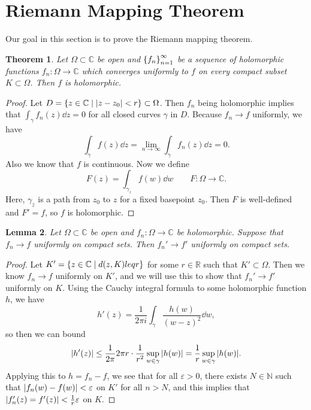 \documentclass[leqno, openany]{memoir}
\newtheorem{thm}{Theorem}[section]
\newtheorem{lem}[thm]{Lemma}
\theoremstyle{definition}
\theoremstyle{remark}
\theoremstyle{plain}
\theoremstyle{definition}
\theoremstyle{remark}
\newcommand{\R}{\mathbb{R}}
\newcommand{\C}{\mathbb{C}}
\newcommand{\N}{\mathbb{N}}
\newcommand{\ep}{\varepsilon}
\begin{document}
\section{Riemann Mapping Theorem}%
\label{sec:riemann_mapping_theorem}

Our goal in this section is to prove the Riemann mapping theorem.

\begin{thm}
    Let $\Omega \subset \C$ be open and $\qty{f_n}_{n=1}^{\infty}$ be a sequence of holomorphic functions $f_n \colon \Omega \to \C$ which converges uniformly to $f$ on every compact subset $K \subset \Omega$. Then $f$ is holomorphic.
\end{thm}

\begin{proof}
    Let $D = \qty{z \in \C \mid \abs{z - z_0} < r} \subset \Omega$. Then $f_n$ being holomorphic implies that $\int_{\gamma} f_n(z) \dd{z} = 0$ for all closed curves $\gamma$ in $D$. Because $f_n \to f$ uniformly, we have
    \[ \int_{\gamma} f(z) \dd{z} = \lim_{n \to \infty} \int_{\gamma} f_n(z) \dd{z} = 0. \]
    Also we know that $f$ is continuous. Now we define
    \[ F(z) = \int_{\gamma_z} f(w) \dd{w} \qquad F \colon \Omega \to \C. \]
    Here, $\gamma_z$ is a path from $z_0$ to $z$ for a fixed basepoint $z_0$. Then $F$ is well-defined and $F' = f$, so $f$ is holomorphic.
\end{proof}

\begin{lem}
    Let $\Omega \subset \C$ be open and $f_n \colon \Omega \to \C$ be holomorphic. Suppose that $f_n \to f$ uniformly on compact sets. Then $f_n' \to f'$ uniformly on compact sets.
\end{lem}

\begin{proof}
    Let $K' = \qty{z \in \C \mid d(z,K) leq r}$ for some $r \in \R$ such that $K' \subset \Omega$. Then we know $f_n \to f$ uniformly on $K'$, and we will use this to show that $f_n' \to f'$ uniformly on $K$. Using the Cauchy integral formula to some holomorphic function $h$, we have
    \[ h'(z) = \frac{1}{2 \pi i} \int_{\gamma} \frac{h(w)}{{(w-z)}^2} \dd{w}, \]
    so then we can bound
    \[ \abs{h'(z)} \leq \frac{1}{2\pi} 2 \pi r \cdot \frac{1}{r^2} \sup_{w \in \gamma} \abs{h(w)} = \frac{1}{r} \sup_{w \in \gamma} \abs{h(w)}. \]
    Applying this to $h = f_n - f$, we see that for all $\ep > 0$, there exists $N \in \N$ such that $\abs{f_n(w) - f(w)} < \ep$ on $K'$ for all $n > N$, and this implies that $\abs{f_n'(z) = f'(z)} < \frac{1}{r} \ep$ on $K$.
\end{proof}
\end{document}
